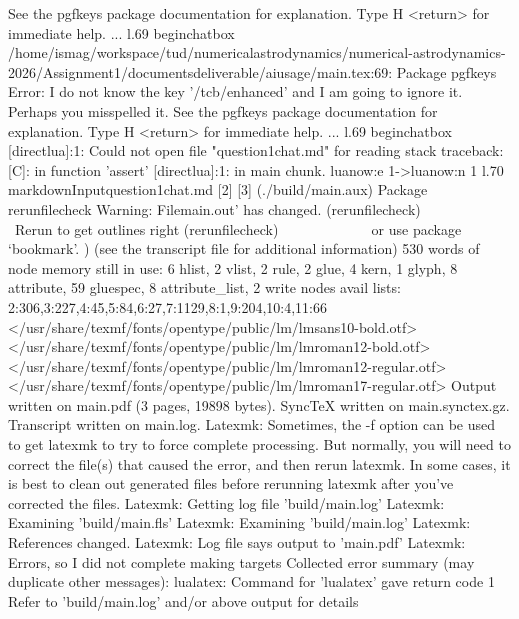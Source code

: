 {{See the pgfkeys package documentation for explanation.
Type \markdownRendererNbsp{}H <return> \markdownRendererNbsp{}for immediate help.
...
l.69 \markdownRendererBackslash{}begin\markdownRendererLeftBrace{}chatbox\markdownRendererRightBrace{}
/home/ismag/workspace/tud/numerical\markdownRendererUnderscore{}astrodynamics/numerical-astrodynamics-2026/Assignment1/documents\markdownRendererUnderscore{}deliverable/ai\markdownRendererUnderscore{}usage/main.tex:69: Package pgfkeys Error: I do not know the key '/tcb/enhanced' and I am going to ignore it. Perhaps you misspelled it.
See the pgfkeys package documentation for explanation.
Type \markdownRendererNbsp{}H <return> \markdownRendererNbsp{}for immediate help.
...
l.69 \markdownRendererBackslash{}begin\markdownRendererLeftBrace{}chatbox\markdownRendererRightBrace{}
[\markdownRendererBackslash{}directlua]:1: Could not open file "question1\markdownRendererUnderscore{}chat.md" for reading
stack traceback:
[C]: in function 'assert'
[\markdownRendererBackslash{}directlua]:1: in main chunk.
\markdownRendererBackslash{}lua\markdownRendererUnderscore{}now:e \markdownRendererHash{}1->\markdownRendererBackslash{}\markdownRendererUnderscore{}\markdownRendererUnderscore{}lua\markdownRendererUnderscore{}now:n \markdownRendererLeftBrace{}\markdownRendererHash{}1\markdownRendererRightBrace{}
l.70 \markdownRendererNbsp{} \markdownRendererNbsp{} \markdownRendererBackslash{}markdownInput\markdownRendererLeftBrace{}question1\markdownRendererUnderscore{}chat.md\markdownRendererRightBrace{}
[2] [3] (./build/main.aux)
Package rerunfilecheck Warning: File}main.out' has changed. (rerunfilecheck)                Rerun to get outlines right (rerunfilecheck)                or use package `bookmark'. ) (see the transcript file for additional information) 530 words of node memory still in use: 6 hlist, 2 vlist, 2 rule, 2 glue, 4 kern, 1 glyph, 8 attribute, 59 glue}spec, 8 attribute_list, 2 write nodes avail lists: 2:306,3:227,4:45,5:84,6:27,7:1129,8:1,9:204,10:4,11:66 </usr/share/texmf/fonts/opentype/public/lm/lmsans10-bold.otf></usr/share/texmf/fonts/opentype/public/lm/lmroman12-bold.otf></usr/share/texmf/fonts/opentype/public/lm/lmroman12-regular.otf></usr/share/texmf/fonts/opentype/public/lm/lmroman17-regular.otf> Output written on main.pdf (3 pages, 19898 bytes). SyncTeX written on main.synctex.gz. Transcript written on main.log. Latexmk: Sometimes, the -f option can be used to get latexmk to try to force complete processing. But normally, you will need to correct the file(s) that caused the error, and then rerun latexmk. In some cases, it is best to clean out generated files before rerunning latexmk after you've corrected the files. Latexmk: Getting log file 'build/main.log' Latexmk: Examining 'build/main.fls' Latexmk: Examining 'build/main.log' Latexmk: References changed. Latexmk: Log file says output to 'main.pdf' Latexmk: Errors, so I did not complete making targets Collected error summary (may duplicate other messages): lualatex: Command for 'lualatex' gave return code 1 Refer to 'build/main.log' and/or above output for details\markdownRendererInterblockSeparator
